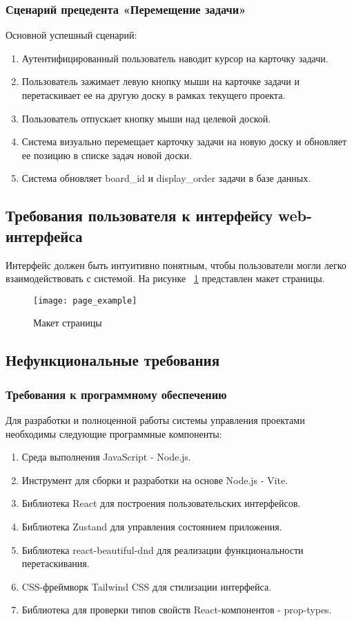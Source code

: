 \subsubsection{Сценарий прецедента «Перемещение задачи»}
Основной успешный сценарий:
\begin{enumerate}
	\item Аутентифицированный пользователь наводит курсор на карточку задачи.
	\item Пользователь зажимает левую кнопку мыши на карточке задачи и перетаскивает ее на другую доску в рамках текущего проекта.
	\item Пользователь отпускает кнопку мыши над целевой доской.
	\item Система визуально перемещает карточку задачи на новую доску и обновляет ее позицию в списке задач новой доски.
	\item Система обновляет board\_id и display\_order задачи в базе данных.
\end{enumerate}

\subsection{Требования пользователя к интерфейсу web-интерфейса}
Интерфейс должен быть интуитивно понятным, чтобы пользователи могли легко взаимодействовать с системой.
На рисунке ~\ref{page_example:image} представлен макет страницы.

\begin{figure}[H]
	\centering
	\texttt{[image: page\_example]}
	\caption{Макет страницы}
	\label{page_example:image}
\end{figure}

\subsection{Нефункциональные требования}

\subsubsection{Требования к программному обеспечению}

Для разработки и полноценной работы системы управления проектами необходимы следующие программные компоненты:

\begin{enumerate}
	\item Среда выполнения JavaScript - Node.js.
	\item Инструмент для сборки и разработки на основе Node.js - Vite.
	\item Библиотека React для построения пользовательских интерфейсов.
	\item Библиотека Zustand для управления состоянием приложения.
	\item Библиотека react-beautiful-dnd для реализации функциональности перетаскивания.
	\item CSS-фреймворк Tailwind CSS для стилизации интерфейса.
	\item Библиотека для проверки типов свойств React-компонентов - prop-types.
\end{enumerate}

